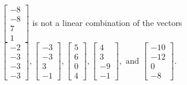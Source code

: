 \begin{exercise}
\begin{exerciseStatement}
  \end{exerciseStatement}
  \begin{exerciseAnswer}
   \(\left[\begin{array}{c}
-8 \\
-8 \\
7 \\
1
\end{array}\right]\) 
  	 is not  
	a linear combination of the vectors \(\left[\begin{array}{c}
-2 \\
-3 \\
-3 \\
-3
\end{array}\right] , \left[\begin{array}{c}
-3 \\
-3 \\
3 \\
-1
\end{array}\right] , \left[\begin{array}{c}
5 \\
6 \\
0 \\
4
\end{array}\right] , \left[\begin{array}{c}
4 \\
3 \\
-9 \\
-1
\end{array}\right] , \text{ and } \left[\begin{array}{c}
-10 \\
-12 \\
0 \\
-8
\end{array}\right]\).

	
  


  \end{exerciseAnswer}
\end{exercise}